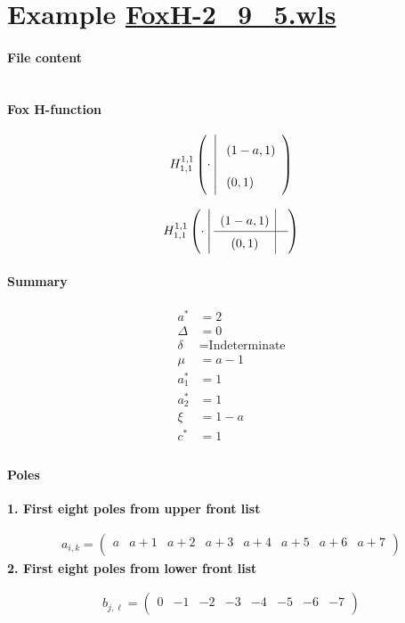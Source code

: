 \documentclass[11pt]{article}
\begin{document}
\section{Example \url{FoxH-2_9_5.wls}}

\paragraph{File content}

\inputminted{text}{FoxH-2_9_5.wls}

\paragraph{Fox H-function}

\begin{align*}
  \FoxH
    {1,1}
    {1,1}
    {\cdot}
    {\left(1-a, 1\right)}
    {\left(0, 1\right)}
\end{align*}

\begin{align*}
  \FoxHext
    {1,1}
    {1,1}
    {\cdot}
    {\left(1-a, 1\right)}
    {}
    {\left(0, 1\right)}
    {}
\end{align*}

\paragraph{Summary}

\begin{align*}
  a^*    & = 2 \\
  \Delta & = 0 \\
  \delta & = \text{Indeterminate} \\
  \mu    & = a-1 \\
  a_1^*  & = 1 \\
  a_2^*  & = 1 \\
  \xi    & = 1-a \\
  c^*    & = 1 \\
\end{align*}

\paragraph{Poles}

\noindent\textbf{1. First eight poles from upper front list}

\begin{align*}
  a_{i,k} = 
  \left(
\begin{array}{cccccccc}
 a & a+1 & a+2 & a+3 & a+4 & a+5 & a+6 & a+7 \\
\end{array}
\right)
\end{align*}
\noindent\textbf{2. First eight poles from lower front list}

\begin{align*}
  b_{j,\ell} = 
  \left(
\begin{array}{cccccccc}
 0 & -1 & -2 & -3 & -4 & -5 & -6 & -7 \\
\end{array}
\right)
\end{align*}

\printbibliography[title={References}]
\end{document}
